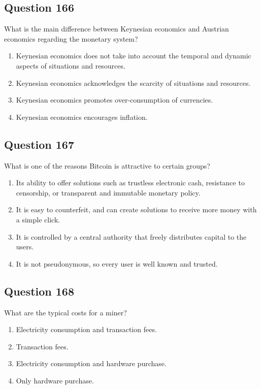 \documentclass[12pt,a4paper]{article}
\begin{document}
\bigskip


\subsection*{Question 166}
What is the main difference between Keynesian economics and Austrian economics regarding the monetary system?

\begin{enumerate}[label=\Alph*., leftmargin=*]
\item Keynesian economics does not take into account the temporal and dynamic aspects of situations and resources.
\item Keynesian economics acknowledges the scarcity of situations and resources.
\item Keynesian economics promotes over-consumption of currencies.
\item Keynesian economics encourages inflation.
\end{enumerate}

\bigskip


\subsection*{Question 167}
What is one of the reasons Bitcoin is attractive to certain groups?

\begin{enumerate}[label=\Alph*., leftmargin=*]
\item Its ability to offer solutions such as trustless electronic cash, resistance to censorship, or transparent and immutable monetary policy.
\item It is easy to counterfeit, and can create solutions to receive more money with a simple click.
\item It is controlled by a central authority that freely distributes capital to the users.
\item It is not pseudonymous, so every user is well known and trusted.
\end{enumerate}

\bigskip


\subsection*{Question 168}
What are the typical costs for a miner?

\begin{enumerate}[label=\Alph*., leftmargin=*]
\item Electricity consumption and transaction fees.
\item Transaction fees.
\item Electricity consumption and hardware purchase.
\item Only hardware purchase.
\end{enumerate}
\end{document}
